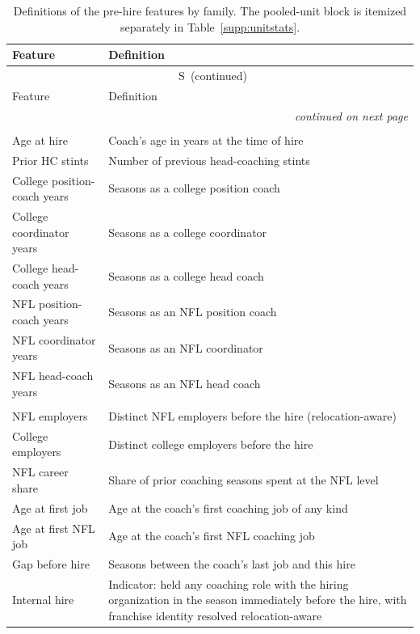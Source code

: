 \documentclass[12pt,USenglish]{article}
\renewcommand{\thetable}{S\arabic{table}}
\begin{document}
{\footnotesize\singlespacing
\begin{longtable}{@{}l p{8.6cm}@{}}
\caption{Definitions of the pre-hire features by family. The pooled-unit block is itemized separately in Table~\ref{supp:unitstats}.}
\label{supp:featuredefs}\\
\toprule
Feature & Definition \\
\midrule
\endfirsthead
\multicolumn{2}{c}{\tablename~\thetable\ (continued)}\\[2pt]
\toprule
Feature & Definition \\
\midrule
\endhead
\midrule
\multicolumn{2}{r}{\footnotesize\itshape continued on next page}\\
\endfoot
\bottomrule
\endlastfoot
\multicolumn{2}{@{}l}{\emph{Core experience (8)}}\\[2pt]
Age at hire & Coach's age in years at the time of hire \\
Prior HC stints & Number of previous head-coaching stints \\
College position-coach years & Seasons as a college position coach \\
College coordinator years & Seasons as a college coordinator \\
College head-coach years & Seasons as a college head coach \\
NFL position-coach years & Seasons as an NFL position coach \\
NFL coordinator years & Seasons as an NFL coordinator \\
NFL head-coach years & Seasons as an NFL head coach \\
\addlinespace
\multicolumn{2}{@{}l}{\emph{Career structure (16)}}\\[2pt]
NFL employers & Distinct NFL employers before the hire (relocation-aware) \\
College employers & Distinct college employers before the hire \\
NFL career share & Share of prior coaching seasons spent at the NFL level \\
Age at first job & Age at the coach's first coaching job of any kind \\
Age at first NFL job & Age at the coach's first NFL coaching job \\
Gap before hire & Seasons between the coach's last job and this hire \\
Internal hire & Indicator: held any coaching role with the hiring organization in the season immediately before the hire, with franchise identity resolved relocation-aware \\

\end{longtable}}
\end{document}
